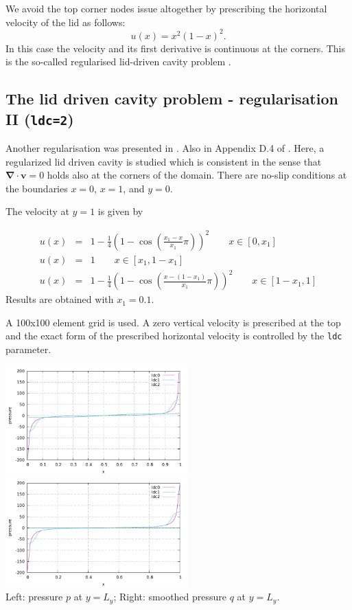 We avoid the top corner nodes issue altogether by  
prescribing the horizontal velocity of the lid as follows: 
\begin{equation}
u(x)=x^2(1-x)^2.
\end{equation}
In this case the velocity and its first derivative is continuous at the corners. This is the so-called regularised lid-driven cavity problem \cite{piva94}.

\subsection*{The lid driven cavity problem - regularisation II ({\tt ldc=2})}

Another regularisation was presented in \cite{dejn16}. Also in Appendix D.4 of \cite{john16}. 
Here, a regularized lid driven cavity is studied which is consistent in the sense that 
${\bm \nabla}\cdot{\bm v}=0$ 
holds also at the corners of the domain.
There are no-slip conditions at the boundaries $x=0$, $x=1$, and $y=0$. 

The velocity at $y=1$ is given by

\begin{eqnarray}
u(x) &=& 1-\frac{1}{4}\left( 1-\cos (\frac{x_1-x}{x_1}\pi)  \right)^2   \quad\quad x\in[0,x_1] \nonumber\\
u(x) &=& 1 \quad\quad x\in[x_1,1-x_1] \nonumber\\
u(x) &=& 1-\frac{1}{4}\left( 1-\cos (\frac{x-(1-x_1)}{x_1}\pi)  \right)^2   \quad\quad x\in[1-x_1,1]
\end{eqnarray}
Results are obtained with $x_1=0.1$.

\newpage
A 100x100 element grid is used. 
A zero vertical velocity is prescribed at the top and the exact form of the 
prescribed horizontal velocity is controlled by the {\tt ldc} parameter.

\begin{center}
\includegraphics[width=7cm]{python_codes/fieldstone_04/results/p.pdf}
\includegraphics[width=7cm]{python_codes/fieldstone_04/results/q.pdf}\\
{\captionfont Left: pressure $p$ at $y=L_y$; Right: smoothed pressure $q$ at $y=L_y$.}
\end{center}

